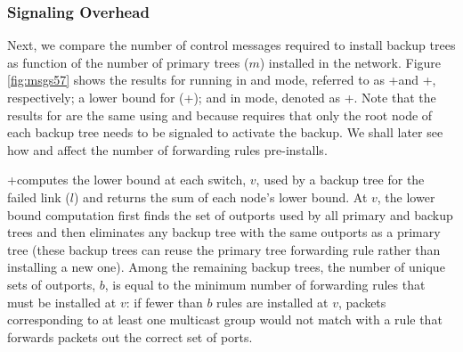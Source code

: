 


\subsubsection{Signaling Overhead}
\label{subsubsec:eval-signaling}

Next, we compare the number of control messages required to install backup trees as function of the number of primary trees ($m$) installed in the network.  Figure \ref{fig:msgs57} shows the results for 
\post running in \base and \merge mode, referred to as \posts+\base and \posts+\merges, respectively; a lower bound for \post (\posts+\lbs); and \pre in \base mode, denoted as \pres+\bases.  
Note that the results for \pre are the same using \base and \merge because \pre requires 
that only the root node of each backup tree needs to be signaled to activate the backup.  We shall later see how \base and \merge affect the number of forwarding
rules \pre pre-installs.

\posts+\lb computes the lower bound at each switch, $v$, used by a backup tree for the failed link ($l$) and returns the sum of each node's lower bound.
At $v$, the lower bound computation first finds the set of outports used by all primary and backup trees and then eliminates any backup tree with the same outports as a primary tree
(these backup trees can reuse the primary tree forwarding rule rather than installing a new one).  
Among the remaining backup trees, the number of unique sets of outports, $b$, is equal to the minimum number of 
forwarding rules that must be installed at $v$: if fewer than $b$ rules are installed at $v$, packets corresponding to at least one multicast group would not match with a rule that forwards
packets out the correct set of ports.

